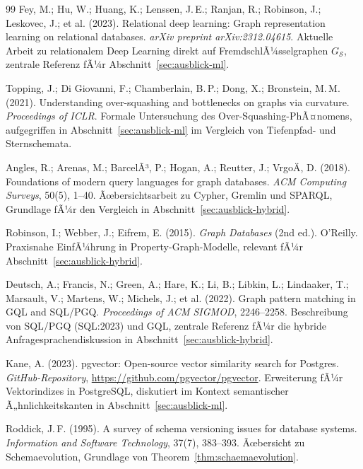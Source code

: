 ﻿\documentclass[a4paper,12pt]{report}
\theoremstyle{definition}
\theoremstyle{remark}
\begin{document}
\begin{thebibliography}{99}
Fey, M.; Hu, W.; Huang, K.; Lenssen, J.\,E.; Ranjan, R.; Robinson, J.;
Leskovec, J.; et al. (2023).
\newblock Relational deep learning: Graph representation learning on
relational databases.
\newblock \emph{arXiv preprint arXiv:2312.04615}.
\newblock Aktuelle Arbeit zu relationalem Deep Learning direkt auf
FremdschlÃ¼sselgraphen $G_{\mathcal{S}}$, zentrale Referenz fÃ¼r
Abschnitt~\ref{sec:ausblick-ml}.

Topping, J.; Di Giovanni, F.; Chamberlain, B.\,P.; Dong, X.;
Bronstein, M.\,M. (2021).
\newblock Understanding over-squashing and bottlenecks on graphs via
curvature.
\newblock \emph{Proceedings of ICLR}.
\newblock Formale Untersuchung des Over-Squashing-PhÃ¤nomens,
aufgegriffen in Abschnitt~\ref{sec:ausblick-ml} im Vergleich von
Tiefenpfad- und Sternschemata.

Angles, R.; Arenas, M.; BarcelÃ³, P.; Hogan, A.; Reutter, J.;
VrgoÄ, D. (2018).
\newblock Foundations of modern query languages for graph databases.
\newblock \emph{ACM Computing Surveys}, 50(5), 1--40.
\newblock Ãœbersichtsarbeit zu Cypher, Gremlin und SPARQL, Grundlage
fÃ¼r den Vergleich in Abschnitt~\ref{sec:ausblick-hybrid}.

Robinson, I.; Webber, J.; Eifrem, E. (2015).
\newblock \emph{Graph Databases} (2nd ed.).
\newblock O'Reilly.
\newblock Praxisnahe EinfÃ¼hrung in Property-Graph-Modelle, relevant
fÃ¼r Abschnitt~\ref{sec:ausblick-hybrid}.

Deutsch, A.; Francis, N.; Green, A.; Hare, K.; Li, B.; Libkin, L.;
Lindaaker, T.; Marsault, V.; Martens, W.; Michels, J.; et al. (2022).
\newblock Graph pattern matching in GQL and SQL/PGQ.
\newblock \emph{Proceedings of ACM SIGMOD}, 2246--2258.
\newblock Beschreibung von SQL/PGQ (SQL:2023) und GQL, zentrale
Referenz fÃ¼r die hybride Anfragesprachendiskussion in
Abschnitt~\ref{sec:ausblick-hybrid}.

Kane, A. (2023).
\newblock pgvector: Open-source vector similarity search for Postgres.
\newblock \emph{GitHub-Repository}, \url{https://github.com/pgvector/pgvector}.
\newblock Erweiterung fÃ¼r Vektorindizes in PostgreSQL, diskutiert im
Kontext semantischer Ã„hnlichkeitskanten in
Abschnitt~\ref{sec:ausblick-ml}.

Roddick, J.\,F. (1995).
\newblock A survey of schema versioning issues for database systems.
\newblock \emph{Information and Software Technology}, 37(7), 383--393.
\newblock Ãœbersicht zu Schemaevolution, Grundlage von
Theorem~\ref{thm:schaemaevolution}.


\end{thebibliography}
\end{document}
